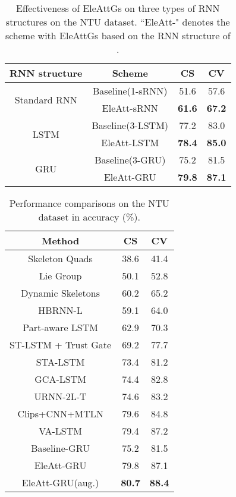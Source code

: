 \documentclass[runningheads]{llncs}
\newcommand{\EleAttGn}{{EleAttG}}
\begin{document}
\setlength{\tabcolsep}{7pt}
\begin{table}[t] \centering
\caption{Effectiveness of {\EleAttGn}s on three types of RNN structures on the NTU dataset. ``EleAtt-" denotes the scheme with {\EleAttGn}s based on the RNN structure of .}
	\label{tab:Extend}
	\begin{tabular}{cccc}
		\toprule
		RNN structure                    & Scheme     & CS & CV \\
		\midrule
		\multirow{2}{*}{Standard RNN} & Baseline(1-sRNN)   & 51.6    & 57.6 \\
		& EleAtt-sRNN & \textbf{61.6}     & \textbf{67.2}  \\
		\midrule
		\multirow{2}{*}{LSTM}      & Baseline(3-LSTM)   & 77.2     & 83.0  \\
		& EleAtt-LSTM     & \textbf{78.4}     & \textbf{85.0}  \\
		\midrule
		\multirow{2}{*}{GRU}       & Baseline(3-GRU)   & 75.2     & 81.5  \\
		& EleAtt-GRU       & \textbf{79.8}     & \textbf{87.1} 							\\
		\bottomrule	
	\end{tabular}
\end{table}

\setlength{\tabcolsep}{7pt}
\begin{table}[t] \centering
\caption{Performance comparisons on the NTU dataset in accuracy (\%).}
	\label{tab:ntu}
	\begin{tabular}{ccc}
		\toprule
		{Method}                                           & CS & CV \\
		\midrule
		{Skeleton Quads \cite{evangelidis2014skeletal}}  & 38.6     & 41.4  \\
		{Lie Group \cite{vemulapalli2014human}}          & 50.1     & 52.8  \\
		{Dynamic Skeletons  \cite{hu2015jointly}}        & 60.2    & 65.2  \\
		{HBRNN-L  \cite{du2015hierarchical}}             & 59.1     & 64.0  \\
		{Part-aware LSTM   \cite{Shahroudy_2016_CVPR}} & 62.9     & 70.3  \\
		{ST-LSTM + Trust Gate \cite{liu2016spatio}}      & 69.2     & 77.7  \\
		{STA-LSTM \cite{song2017end}}                    & 73.4     & 81.2  \\
		{GCA-LSTM \cite{liu2017global}}                  & 74.4     & 82.8  \\
		{URNN-2L-T \cite{li2017adaptive}}                & 74.6     & 83.2  \\
		{Clips+CNN+MTLN \cite{ke2017new}}                & 79.6     & 84.8  \\
		{VA-LSTM \cite{zhang2017view}}                   & 79.4     & 87.2  \\
		\midrule
		Baseline-GRU  & 75.2 & 81.5 \\
		EleAtt-GRU & 79.8  & 87.1 \\
		EleAtt-GRU(aug.)     & \textbf{80.7}    & \textbf{88.4} \\
		\bottomrule
	\end{tabular}
\end{table}
\end{document}
